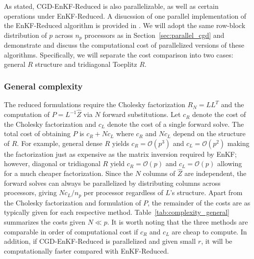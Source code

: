 \documentclass[11p]{elsarticle}
\numberwithin{equation}{section}
\newcommand{\vect}[1]{\ensuremath{\bm{#1}}}
\begin{document}
As stated, CGD-EnKF-Reduced is also parallelizable, as well as certain operations under EnKF-Reduced.  A disucssion of one parallel implementation of the EnKF-Reduced algorithm is provided in \cite{Houtekamer2014}.  We will adopt the same row-block distribution of $p$ across $n_p$ processors as in Section~\ref{sec:parallel_cgd} and demonstrate and discuss the computational cost of parallelized versions of these algorithms.  Specifically, we will separate the cost comparison into two cases: general $R$ structure and tridiagonal Toeplitz $R$.           

  \subsubsection{General complexity}

  The reduced formulations require the Cholesky factorization $R_N = LL^T$ and the computation of $P = L^{-1}\widehat{Z}$ via $N$ forward substitutions.  Let $c_R$ denote the cost of the Cholesky factorization and $c_L$ denote the cost of a single forward solve. 
  The total cost of obtaining $P$ is
  $c_R + N c_L$ where $c_R$ and $Nc_L$  depend on the structure of
  $R$.  For example, general dense $R$ yields $c_R = \mathcal{O}(p^3)$ and $c_L = \mathcal{O}(p^2)$ making the factorization just as expensive as the matrix inversion required by EnKF; however, diagonal or tridiagonal $R$ yield $c_R = \mathcal{O}(p)$ and $c_L = \mathcal{O}(p)$ allowing for a much cheaper factorization.  Since the $N$ columns of $\widehat{Z}$ are independent, the forward
  solves can always be parallelized by distributing columns across
  processors, giving $Nc_L/n_p$ per processor
  regardless of $L$'s structure.  Apart from the Cholesky factorization and formulation of $P$, the remainder of the costs are as typically given for each respective method.  Table~\ref{tab:complexity_general} summarizes the costs given $N \ll p$.  It is worth noting that the three methods are comparable in order of computational cost if $c_R$ and $c_L$ are cheap to compute.  In addition, if CGD-EnKF-Reduced is parallelized and given small $r$, it will be computationally faster compared with EnKF-Reduced.
\end{document}
